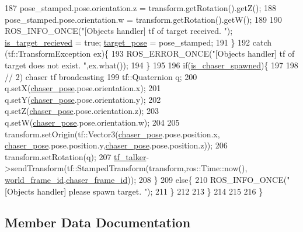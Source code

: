 \begin{DoxyCode}
187             pose\_stamped.pose.orientation.z = transform.getRotation().getZ();
188             pose\_stamped.pose.orientation.w = transform.getRotation().getW();        
189 
190             ROS\_INFO\_ONCE(\textcolor{stringliteral}{"[Objects handler] tf of target received. "}); 
      \hyperlink{class_objects_handler_a7691f3e1ec58e55ead30c50c555f169a}{is\_target\_recieved} = \textcolor{keyword}{true}; \hyperlink{class_objects_handler_ad436bfd8b262f473f0e4ca92b3c3402b}{target\_pose} = pose\_stamped;
191         \}
192         \textcolor{keywordflow}{catch} (tf::TransformException ex)\{
193             ROS\_ERROR\_ONCE(\textcolor{stringliteral}{"[Objects handler] tf of target does not exist. "},ex.what());  
194         \}    
195             
196         \textcolor{keywordflow}{if}(\hyperlink{class_objects_handler_a16165ae7c0167ba8d2a0151a8a4fbfd5}{is\_chaser\_spawned})\{
197 
198             \textcolor{comment}{// 2) chaser tf broadcasting}
199             tf::Quaternion q;
200             q.setX(\hyperlink{class_objects_handler_a79fd5f872a40cca5ea599f1e83dcb3ad}{chaser\_pose}.pose.orientation.x);
201             q.setY(\hyperlink{class_objects_handler_a79fd5f872a40cca5ea599f1e83dcb3ad}{chaser\_pose}.pose.orientation.y);
202             q.setZ(\hyperlink{class_objects_handler_a79fd5f872a40cca5ea599f1e83dcb3ad}{chaser\_pose}.pose.orientation.z);
203             q.setW(\hyperlink{class_objects_handler_a79fd5f872a40cca5ea599f1e83dcb3ad}{chaser\_pose}.pose.orientation.w);
204             
205             transform.setOrigin(tf::Vector3(\hyperlink{class_objects_handler_a79fd5f872a40cca5ea599f1e83dcb3ad}{chaser\_pose}.pose.position.x,
      \hyperlink{class_objects_handler_a79fd5f872a40cca5ea599f1e83dcb3ad}{chaser\_pose}.pose.position.y,\hyperlink{class_objects_handler_a79fd5f872a40cca5ea599f1e83dcb3ad}{chaser\_pose}.pose.position.z));
206             transform.setRotation(q);
207             \hyperlink{class_objects_handler_af49de4eabb124e2ee6c9e12ebb31bca3}{tf\_talker}->sendTransform(tf::StampedTransform(transform,ros::Time::now(),
      \hyperlink{class_objects_handler_a1c0586ae7467bb8a3df8ad247ac7b10b}{world\_frame\_id},\hyperlink{class_objects_handler_a3e8d08bf5d76d69f1768b53fd799953c}{chaser\_frame\_id}));        
208         \}
209         \textcolor{keywordflow}{else}\{
210             ROS\_INFO\_ONCE(\textcolor{stringliteral}{"[Objects handler] please spawn target. "});  
211         \}
212      
213     \}   
214 
215 
216 \}
\end{DoxyCode}


\subsection{Member Data Documentation}
